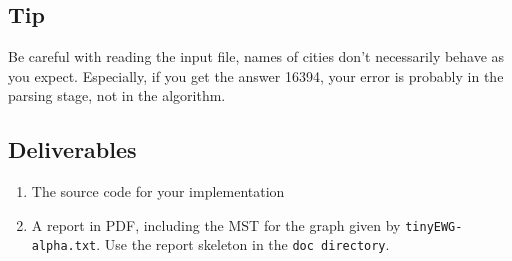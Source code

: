 \documentclass{tufte-handout}
\begin{document}
\subsection{Tip}

Be careful with reading the input file, names of cities don't necessarily behave as you expect. Especially, if you get the answer 16394, your error is probably in the parsing stage, not in the algorithm. 


\subsection{Deliverables}

\begin{enumerate}
  \item The source code for your implementation
  \item A report in PDF, including the MST for the graph given by \verb!tinyEWG-alpha.txt!.
  Use the report skeleton in the {\tt doc directory}.
  \end{enumerate}
\end{document}
